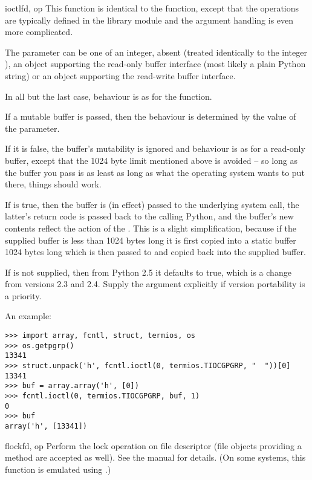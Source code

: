 \begin{funcdesc}{ioctl}{fd, op}
  This function is identical to the  function,
  except that the operations are typically defined in the library
  module  and the argument handling is even more
  complicated.
  
  The parameter  can be one of an integer, absent (treated
  identically to the integer ), an object supporting the
  read-only buffer interface (most likely a plain Python string) or an
  object supporting the read-write buffer interface.
  
  In all but the last case, behaviour is as for the 
  function.
  
  If a mutable buffer is passed, then the behaviour is determined by
  the value of the  parameter.
  
  If it is false, the buffer's mutability is ignored and behaviour is
  as for a read-only buffer, except that the 1024 byte limit mentioned
  above is avoided -- so long as the buffer you pass is as least as
  long as what the operating system wants to put there, things should
  work.
  
  If  is true, then the buffer is (in effect) passed
  to the underlying  system call, the latter's
  return code is passed back to the calling Python, and the buffer's
  new contents reflect the action of the .  This is a
  slight simplification, because if the supplied buffer is less than
  1024 bytes long it is first copied into a static buffer 1024 bytes
  long which is then passed to  and copied back into
  the supplied buffer.
  
  If  is not supplied, then from Python 2.5 it
  defaults to true, which is a change from versions 2.3 and 2.4.
  Supply the argument explicitly if version portability is a priority.

  An example:

\begin{verbatim}
>>> import array, fcntl, struct, termios, os
>>> os.getpgrp()
13341
>>> struct.unpack('h', fcntl.ioctl(0, termios.TIOCGPGRP, "  "))[0]
13341
>>> buf = array.array('h', [0])
>>> fcntl.ioctl(0, termios.TIOCGPGRP, buf, 1)
0
>>> buf
array('h', [13341])
\end{verbatim}
\end{funcdesc}

\begin{funcdesc}{flock}{fd, op}
Perform the lock operation  on file descriptor  (file
  objects providing a  method are accepted as well).
See the \UNIX{} manual  for details.  (On some
systems, this function is emulated using .)
\end{funcdesc}

